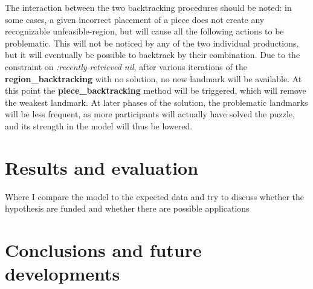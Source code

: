 \documentclass[a4paper,singleside,12pt]{report} %
\begin{document}
	The interaction between the two backtracking procedures should be noted: in some cases, a given
	incorrect placement of a piece does not create any recognizable unfeasible-region, but will
	cause all the following actions to be problematic. This will not be noticed by any of the two
	individual productions, but it will eventually be possible to backtrack by their combination.
	Due to the constraint on \textit{:recently-retrieved nil}, after various iterations of the
	\textbf{region\_backtracking} with no solution, no new landmark will be available. At this point
	the \textbf{piece\_backtracking} method will be triggered, which will remove the weakest
	landmark. At later phases of the solution, the problematic landmarks will be less frequent, as
	more participants will actually have solved the puzzle, and its strength in the model will thus
	be lowered.
  
	
	\chapter{Results and evaluation}
    Where I compare the model to the expected data and try to discuss whether the hypothesis are
    funded and whether there are possible applications
	
	\chapter{Conclusions and future developments}
	\appendix
	
	\printbibliography[heading=bibintoc] %

	
	\acknowledgements
		
		
\end{document}
